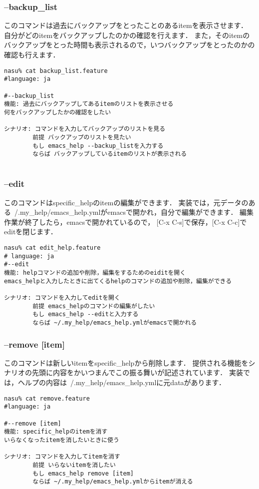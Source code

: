 \subsubsection{--backup\_list}
このコマンドは過去にバックアップをとったことのあるitemを表示させます．
自分がどのitemをバックアップしたのかの確認を行えます．
また，そのitemのバックアップをとった時間も表示されるので，いつバックアップをとったのかの確認も行えます．
\begin{lstlisting}[style=customRuby,basicstyle={\scriptsize\ttfamily}]
nasu% cat backup_list.feature
#language: ja

#--backup_list
機能: 過去にバックアップしてあるitemのリストを表示させる
何をバックアップしたかの確認をしたい

シナリオ: コマンドを入力してバックアップのリストを見る
        前提 バックアップのリストを見たい
        もし emacs_help --backup_listを入力する
        ならば バックアップしているitemのリストが表示される
        
\end{lstlisting}
\subsubsection{--edit}
このコマンドはspecific\_helpのitemの編集ができます．
実装では，元データのある~/.my\_help/emacs\_help.ymlがemacsで開かれ，自分で編集ができます．
編集作業が終了したら，emacsで開かれているので， [C-x C-s]で保存，[C-x C-c]でeditを閉じます．
\begin{lstlisting}[style=customRuby,basicstyle={\scriptsize\ttfamily}]
nasu% cat edit_help.feature
# language: ja
#--edit
機能: helpコマンドの追加や削除，編集をするためのeiditを開く
emacs_helpと入力したときに出てくるhelpのコマンドの追加や削除，編集ができる

シナリオ: コマンドを入力してeditを開く
        前提 emacs_helpのコマンドの編集がしたい
        もし emacs_help --editと入力する
        ならば ~/.my_help/emacs_help.ymlがemacsで開かれる
\end{lstlisting}
\subsubsection{--remove [item]}
このコマンドは新しいitemをspecific\_helpから削除します．
提供される機能をシナリオの先頭に内容をかいつまんでこの振る舞いが記述されています．
実装では，ヘルプの内容は~/.my\_help/emacs\_help.ymlに元dataがあります．
\begin{lstlisting}[style=customRuby,basicstyle={\scriptsize\ttfamily}]
nasu% cat remove.feature
#language: ja

#--remove [item]
機能: specific_helpのitemを消す
いらなくなったitemを消したいときに使う

シナリオ: コマンドを入力してitemを消す
        前提 いらないitemを消したい
        もし emacs_help remove [item]
        ならば ~/.my_help/emacs_help.ymlからitemが消える

\end{lstlisting}
